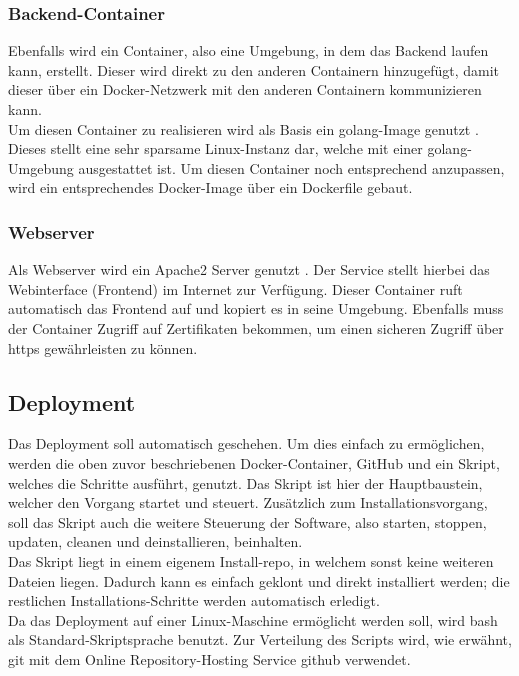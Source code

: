 		\subsubsection{Backend-Container}
		
		Ebenfalls wird ein Container, also eine Umgebung, in dem das Backend laufen kann, erstellt. Dieser wird direkt zu den anderen Containern hinzugefügt, damit dieser über ein Docker-Netzwerk mit den anderen Containern kommunizieren kann.~\\
		Um diesen Container zu realisieren wird als Basis ein golang-Image genutzt \cite{golang}. Dieses stellt eine sehr sparsame Linux-Instanz dar, welche mit einer golang-Umgebung ausgestattet ist. Um diesen Container noch entsprechend anzupassen, wird ein entsprechendes Docker-Image über ein Dockerfile gebaut.
		
		\subsubsection{Webserver}
		
		Als Webserver wird ein Apache2 Server genutzt \cite{apache}. Der Service stellt hierbei das Webinterface (Frontend) im Internet zur Verfügung. Dieser Container ruft automatisch das Frontend auf und kopiert es in seine Umgebung. Ebenfalls muss der Container Zugriff auf Zertifikaten bekommen, um einen sicheren Zugriff über \gls{https} gewährleisten zu können.
				
	\subsection{Deployment}
	
	Das Deployment soll automatisch geschehen. Um dies einfach zu ermöglichen, werden die oben zuvor beschriebenen Docker-Container, GitHub und ein Skript, welches die Schritte ausführt, genutzt. Das Skript ist hier der Hauptbaustein, welcher den Vorgang startet und steuert. Zusätzlich zum Installationsvorgang, soll das Skript auch die weitere Steuerung der Software, also starten, stoppen, updaten, cleanen und deinstallieren, beinhalten.~\\
	Das Skript liegt in einem eigenem Install-\Gls{repo}, in welchem sonst keine weiteren Dateien liegen. Dadurch kann es einfach geklont und direkt installiert werden; die restlichen Installations-Schritte werden automatisch erledigt.~\\
	Da das Deployment auf einer Linux-Maschine ermöglicht werden soll, wird \Gls{bash} als Standard-Skriptsprache benutzt. Zur Verteilung des Scripts wird, wie erwähnt, \Gls{git} mit dem Online Repository-Hosting Service \Gls{github} verwendet.
